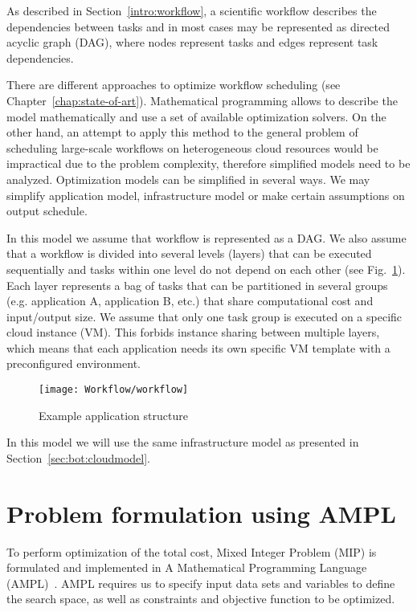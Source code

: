{    As described in Section \ref{intro:workflow}, a scientific workflow describes the dependencies between tasks and in most cases may be represented as directed acyclic graph (DAG), where nodes represent tasks and edges represent task dependencies. 
    
    There are different approaches to optimize workflow scheduling (see Chapter \ref{chap:state-of-art}). Mathematical programming allows to describe the model mathematically and use a set of available optimization solvers. On the other hand, an attempt to apply this method to the general problem of scheduling large-scale workflows on heterogeneous cloud resources would be impractical due to the problem complexity, therefore simplified models need to be analyzed. Optimization models can be simplified in several ways. We may simplify application model, infrastructure model or make certain assumptions on output schedule.
    
    In this model we assume that workflow is represented as a DAG. We also assume that a workflow is divided into several levels (layers) that can be executed sequentially and tasks within one level do not depend on each other (see Fig.~\ref{fig:workflow:appmodel}). Each layer represents a bag of tasks that can be partitioned in several groups (e.g. application A, application B, etc.) that share computational cost and input/output size. We assume that only one task group is executed on a specific cloud instance (VM). This forbids instance sharing between multiple layers, which means that each application needs its own specific VM template with a preconfigured environment.

    \begin{figure}[tb]
        \centering \texttt{[image: Workflow/workflow]}
        \caption{Example application structure}
        \label{fig:workflow:appmodel}
    \end{figure}
    
    In this model we will use the same infrastructure model as presented in Section~\ref{sec:bot:cloudmodel}.
  
    \section{Problem formulation using AMPL}
    \label{sec:workflow:problem}
  
    To perform optimization of the total cost, Mixed Integer Problem (MIP) is formulated and implemented in A Mathematical Programming Language (AMPL)~\cite{Fourer2002}.  AMPL requires us to specify input data sets and variables to define the search space, as well as constraints and objective function to be optimized.
    
}
